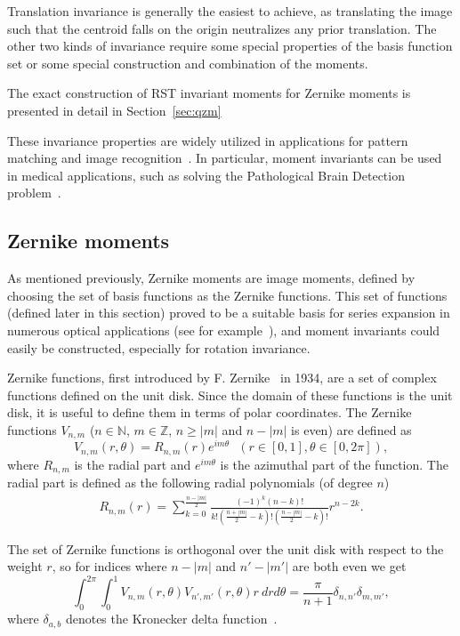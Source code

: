 Translation invariance is generally the easiest to achieve, as translating the image such that the centroid falls on the origin neutralizes any prior translation. The other two kinds of invariance require some special properties of the basis function set or some special construction and combination of the moments.


The exact construction of RST invariant moments for Zernike moments is presented in detail in Section~\ref{sec:qzm}


These invariance properties are widely utilized in applications for pattern matching and image recognition~\cite{app1, app2, app3}. In particular, moment invariants can be used in medical applications, such as solving the Pathological Brain Detection problem~\cite{med_app_1}.


\subsection{Zernike moments}
As mentioned previously, Zernike moments are image moments, defined by choosing the set of basis functions as the Zernike functions. This set of functions (defined later in this section) proved to be a suitable basis for series expansion in numerous optical applications (see for example~\cite{wavefront,optical_human_eye,opt_surf}), and moment invariants could easily be constructed, especially for rotation invariance.


Zernike functions, first introduced by F. Zernike~\cite{zernike} in 1934, are a set of complex functions defined on the unit disk. Since the domain of these functions is the unit disk, it is useful to define them in terms of polar coordinates. The Zernike functions $V_{n,m}$ ($n \in \mathds{N}$, $m \in \mathds{Z}$, $n \geq |m|$ and $n - |m|$ is even) are defined as
\begin{equation}\label{ZernikeFunction}
  V_{n,m}(r,\theta) = R_{n,m}(r) e^{i m\theta} \ \ \ (r\in[0,1], \theta\in[0,2\pi]),
\end{equation}
where $R_{n,m}$ is the radial part and $e^{i m\theta}$ is the azimuthal part of the function. The radial part is defined as the following radial polynomials (of degree $n$)
\begin{gather}
    R_{n,m}(r) = \sum_{k=0}^{\frac{n - |m|}{2}}\frac{(-1)^k (n - k)!}{k!\left(\frac{n + |m|}{2} - k\right)!\left(\frac{n - |m|}{2} - k\right)!}r^{n-2k} \label{eq:radial_poly}.
\end{gather} 


The set of Zernike functions is orthogonal over the unit disk with respect to the weight $r$, so for indices where $n - |m|$ and $n' - |m'|$ are both even we get
\begin{equation}
	\int_0^{2\pi}\int_0^1 V_{n,m}(r,\theta)V_{n',m'}(r,\theta)r\ dr d\theta  = \frac{\pi}{n + 1}\delta_{n,n'}\delta_{m,m'},
\end{equation}
where $\delta_{a,b}$ denotes the Kronecker delta function~\cite{zernike_moments}.

